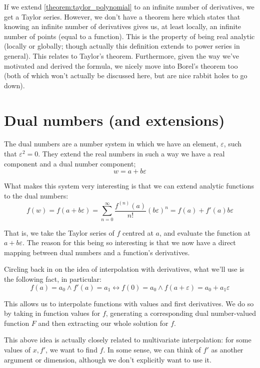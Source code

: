 If we extend \autoref{theorem:taylor_polynomial} to an infinite number of derivatives, we get a Taylor series. However, we don't have a theorem here which states that knowing an infinite number of derivatives gives us, at least locally, an infinite number of points (equal to a function). This is the property of being real analytic (locally or globally; though actually this definition extends to power series in general). This relates to Taylor's theorem. Furthermore, given the way we've motivated and derived the formula, we nicely move into Borel's theorem too (both of which won't actually be discussed here, but are nice rabbit holes to go down).


\section{Dual numbers (and extensions)}
\label{section:dual_numbers}
The dual numbers are a number system in which we have an element, $\varepsilon$, such that $\varepsilon^2=0$. They extend the real numbers in such a way we have a real component and a dual number component;
$$
w=a+b\varepsilon
$$

What makes this system very interesting is that we can extend analytic functions to the dual numbers:
$$
f(w)=f(a+b\varepsilon)=\sum_{n=0}^{\infty}{\frac{f^{(n)}(a)}{n!}(b\varepsilon)^n}=f(a)+f'(a)b\varepsilon
$$

That is, we take the Taylor series of $f$ centred at $a$, and evaluate the function at $a+b\varepsilon$. The reason for this being so interesting is that we now have a direct mapping between dual numbers and a function's derivatives.

Circling back in on the idea of interpolation with derivatives, what we'll use is the following fact, in particular:
$$
    f(a)=a_0\land f'(a)=a_1\leftrightarrow f(0)=a_0\land f(a+\varepsilon)=a_0+a_1\varepsilon
$$

This allows us to interpolate functions with values and first derivatives. We do so by taking in function values for $f$, generating a corresponding dual number-valued function $F$ and then extracting our whole solution for $f$.

This above idea is actually closely related to multivariate interpolation: for some values of $x, f'$, we want to find $f$. In some sense, we can think of $f'$ as another argument or dimension, although we don't explicitly want to use it.

